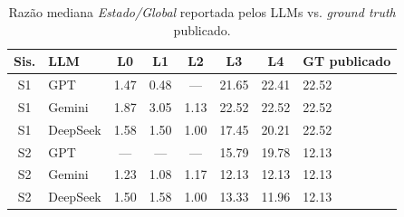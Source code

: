 \begin{table}[h]
\centering
\small
\caption{Raz\~ao mediana \emph{Estado/Global} reportada pelos LLMs vs. \emph{ground truth} publicado.}
\label{tab:sm_regional}
\begin{tabular}{clccccc l}
\toprule
\textbf{Sis.} & \textbf{LLM} & \textbf{L0} & \textbf{L1} & \textbf{L2} & \textbf{L3} & \textbf{L4} & \textbf{GT publicado} \\
\midrule
S1 & GPT & 1.47 & 0.48 & --- & 21.65 & 22.41 & 22.52 \\
S1 & Gemini & 1.87 & 3.05 & 1.13 & 22.52 & 22.52 & 22.52 \\
S1 & DeepSeek & 1.58 & 1.50 & 1.00 & 17.45 & 20.21 & 22.52 \\
\midrule
S2 & GPT & --- & --- & --- & 15.79 & 19.78 & 12.13 \\
S2 & Gemini & 1.23 & 1.08 & 1.17 & 12.13 & 12.13 & 12.13 \\
S2 & DeepSeek & 1.50 & 1.58 & 1.00 & 13.33 & 11.96 & 12.13 \\
\bottomrule
\end{tabular}
\end{table}